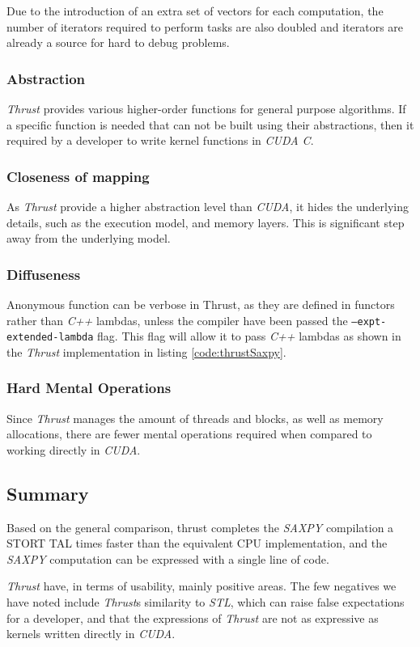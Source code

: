 Due to the introduction of an extra set of vectors for each computation, the number of iterators required to perform tasks are also doubled and iterators are already a source for hard to debug problems.

\subsubsection[*]{Abstraction}
\textit{Thrust} provides various higher-order functions for general purpose algorithms. If a specific function is needed that can not be built using their abstractions, then it required by a developer to write kernel functions in \textit{CUDA C}. 

\subsubsection[*]{Closeness of mapping}
As \textit{Thrust} provide a higher abstraction level than \textit{CUDA}, it hides the underlying details, such as the execution model, and memory layers. This is significant step away from the underlying model.

\subsubsection[*]{Diffuseness}
Anonymous function can be verbose in Thrust, as they are defined in functors rather than \textit{C++} lambdas, unless the compiler have been passed the \texttt{--expt-extended-lambda} flag. This flag will allow it to pass \textit{C++} lambdas as shown in the \textit{Thrust} implementation in listing \ref{code:thrustSaxpy}.

\subsubsection[*]{Hard Mental Operations}
Since \textit{Thrust} manages the amount of threads and blocks, as well as memory allocations, there are fewer mental operations required when compared to working directly in \textit{CUDA}. 

\subsection{Summary}\label{sec:thrustEvelSum}
Based on the general comparison, thrust completes the \textit{SAXPY} compilation a STORT TAL times faster than the equivalent CPU implementation, and the \textit{SAXPY} computation can be expressed with a single line of code.

\textit{Thrust} have, in terms of usability, mainly positive areas. The few negatives we have noted include \textit{Thrust}s similarity to \textit{STL}, which can raise false expectations for a developer, and that the expressions of \textit{Thrust} are not as expressive as kernels written directly in \textit{CUDA}. 
